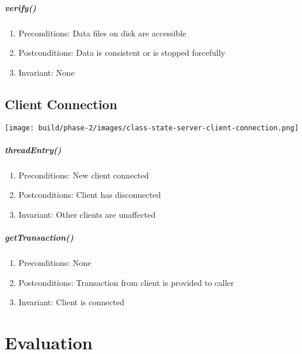 \documentclass[a4paper]{report}
\begin{document}
	\paragraph{verify()}
		\begin{enumerate}
			\item Preconditions: Data files on disk are accessible
			\item Postconditions: Data is consistent or is stopped forcefully
			\item Invariant: None
		\end{enumerate}

	\pagebreak

\section{Client Connection}

	\begin{center}
		\texttt{[image: build/phase-2/images/class-state-server-client-connection.png]}
	\end{center}

	\paragraph{threadEntry()}
		\begin{enumerate}
			\item Preconditions: New client connected
			\item Postconditions: Client has disconnected
			\item Invariant: Other clients are unaffected
		\end{enumerate}

	

	\paragraph{getTransaction()}
		\begin{enumerate}
			\item Preconditions: None
			\item Postconditions: Transaction from client is provided to caller
			\item Invariant: Client is connected
		\end{enumerate}

	\pagebreak

\chapter{Evaluation}
\end{document}
